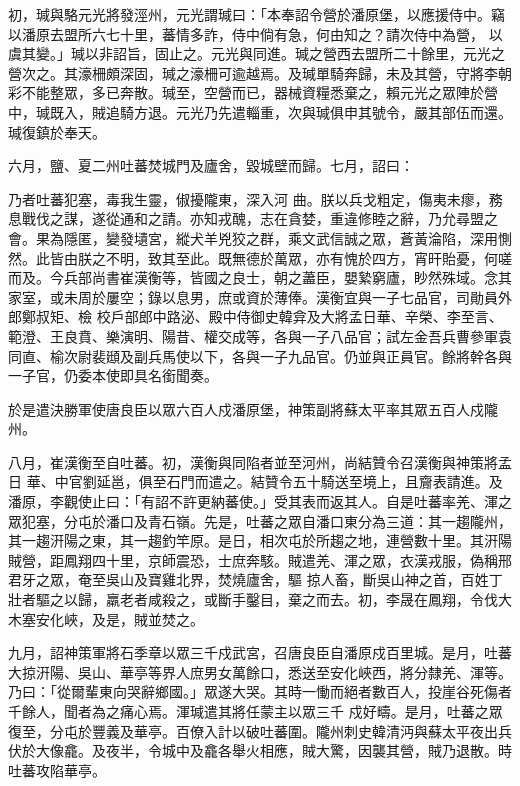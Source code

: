 \begin{pinyinscope}
 初，瑊與駱元光將發涇州，元光謂瑊曰：「本奉詔令營於潘原堡，以應援侍中。竊以潘原去盟所六七十里，蕃情多詐，侍中倘有急，何由知之？請次侍中為營，
 以虞其變。」瑊以非詔旨，固止之。元光與同進。瑊之營西去盟所二十餘里，元光之營次之。其濠柵頗深固，瑊之濠柵可逾越焉。及瑊單騎奔歸，未及其營，守將李朝彩不能整眾，多已奔散。瑊至，空營而已，器械資糧悉棄之，賴元光之眾陣於營中，瑊既入，賊追騎方退。元光乃先遣輜重，次與瑊俱申其號令，嚴其部伍而還。瑊復鎮於奉天。



 六月，鹽、夏二州吐蕃焚城門及廬舍，毀城壁而歸。七月，詔曰：



 乃者吐蕃犯塞，毒我生靈，俶擾隴東，深入河
 曲。朕以兵戈粗定，傷夷未瘳，務息戰伐之謀，遂從通和之請。亦知戎醜，志在貪婪，重違修睦之辭，乃允尋盟之會。果為隱匿，變發壝宮，縱犬羊兇狡之群，乘文武信誠之眾，蒼黃淪陷，深用惻然。此皆由朕之不明，致其至此。既無德於萬眾，亦有愧於四方，宵旰貽憂，何嗟而及。今兵部尚書崔漢衡等，皆國之良士，朝之藎臣，嬰縶窮廬，眇然殊域。念其家室，或未周於屢空；錄以息男，庶或資於薄俸。漢衡宜與一子七品官，司勛員外郎鄭叔矩、檢
 校戶部郎中路泌、殿中侍御史韓弇及大將孟日華、辛榮、李至言、範澄、王良賁、樂演明、陽昔、權交成等，各與一子八品官；試左金吾兵曹參軍袁同直、榆次尉裴頲及副兵馬使以下，各與一子九品官。仍並與正員官。餘將幹各與一子官，仍委本使即具名銜聞奏。



 於是遣決勝軍使唐良臣以眾六百人戍潘原堡，神策副將蘇太平率其眾五百人戍隴州。



 八月，崔漢衡至自吐蕃。初，漢衡與同陷者並至河州，尚結贊令召漢衡與神策將孟日
 華、中官劉延邕，俱至石門而遣之。結贊令五十騎送至境上，且齎表請進。及潘原，李觀使止曰：「有詔不許更納蕃使。」受其表而返其人。自是吐蕃率羌、渾之眾犯塞，分屯於潘口及青石嶺。先是，吐蕃之眾自潘口東分為三道：其一趨隴州，其一趨汧陽之東，其一趨釣竿原。是日，相次屯於所趨之地，連營數十里。其汧陽賊營，距鳳翔四十里，京師震恐，士庶奔駭。賊遣羌、渾之眾，衣漢戎服，偽稱邢君牙之眾，奄至吳山及寶雞北界，焚燒廬舍，驅
 掠人畜，斷吳山神之首，百姓丁壯者驅之以歸，羸老者咸殺之，或斷手鑿目，棄之而去。初，李晟在鳳翔，令伐大木塞安化峽，及是，賊並焚之。



 九月，詔神策軍將石季章以眾三千戍武宮，召唐良臣自潘原戍百里城。是月，吐蕃大掠汧陽、吳山、華亭等界人庶男女萬餘口，悉送至安化峽西，將分隸羌、渾等。乃曰：「從爾輩東向哭辭鄉國。」眾遂大哭。其時一慟而絕者數百人，投崖谷死傷者千餘人，聞者為之痛心焉。渾瑊遣其將任蒙主以眾三千
 戍好疇。是月，吐蕃之眾復至，分屯於豐義及華亭。百僚入計以破吐蕃圍。隴州刺史韓清沔與蘇太平夜出兵伏於大像龕。及夜半，令城中及龕各舉火相應，賊大驚，因襲其營，賊乃退散。時吐蕃攻陷華亭。




\end{pinyinscope}
